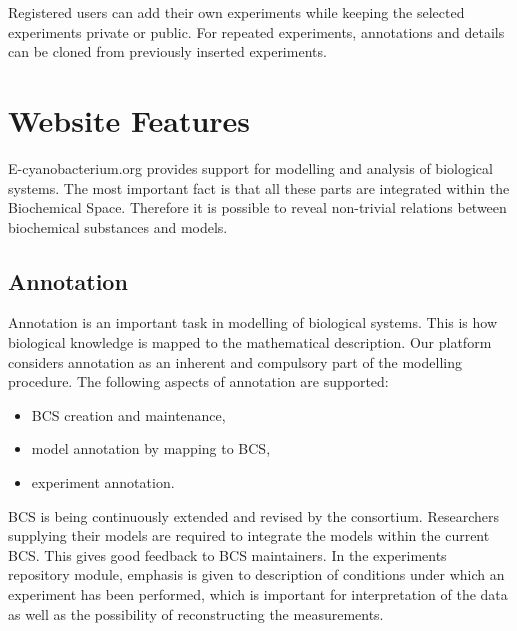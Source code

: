 \documentclass[runningheads]{llncs}
\begin{document}
Registered users can add their own experiments while keeping the selected experiments private or public. For repeated experiments, annotations and details can be cloned from previously inserted experiments.

\section{Website Features}
E-cyanobacterium.org provides support for modelling and analysis of biological systems. The most important fact is that all these parts are integrated within the Biochemical Space. Therefore it is possible to reveal non-trivial relations between biochemical substances and models.

\subsection{Annotation}
\label{anno}
Annotation is an important task in modelling of biological systems. This is how biological knowledge is mapped to the mathematical description. Our platform considers annotation as an inherent and compulsory part of the modelling procedure. The following aspects of annotation are supported:  

\begin{itemize}
\item BCS creation and maintenance,

\item model annotation by mapping to BCS,

\item experiment annotation.

\end{itemize}

BCS is being continuously extended and revised by the consortium. Researchers supplying their models are required to integrate the models within the current BCS. This gives good feedback to BCS maintainers. In the experiments repository module, emphasis is given to description of conditions under which an experiment has been performed, which is important for interpretation of the data as well as the possibility of reconstructing the measurements.  
\end{document}
